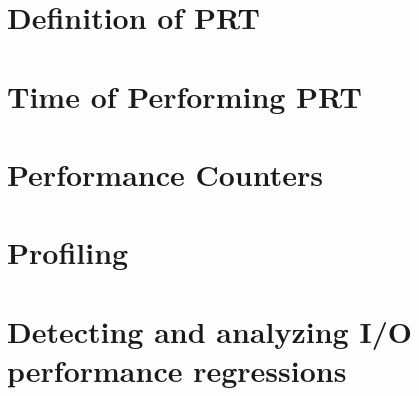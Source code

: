 \documentclass[oneside]{book}
\begin{document}
\clearpage %
\tableofcontents

\clearpage %
\listoffigures

\clearpage %
\listoftables

\mainmatter
% 


\chapter{Definition of PRT}
\label{chapter:definition}


\chapter{Time of Performing PRT}
\label{chapter:timeline}


\chapter{Performance Counters}
\label{chapter:performancecounters}


\chapter{Profiling}
\label{chapter:profiling}


\chapter{Detecting and analyzing I/O performance regressions}
\label{chapter:detecting_analazhing}


\newpage
% 

\appendix



\backmatter

{}



\end{document}
